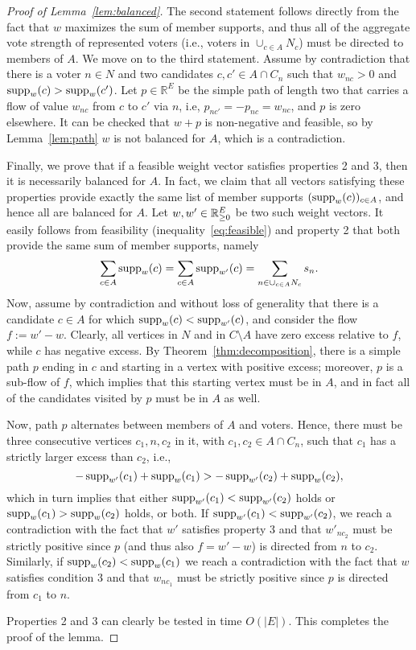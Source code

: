 \begin{proof}[Proof of Lemma~\ref{lem:balanced}]
The second statement follows directly from the fact that $w$ maximizes the sum of member supports, and thus all of the aggregate vote strength of represented voters (i.e., voters in $\cup_{c\in A} N_c$) must be directed to members of $A$. 
We move on to the third statement. 
Assume by contradiction that there is a voter $n\in N$ and two candidates $c, c'\in A\cap C_n$ such that $w_{nc}>0$ and $\operatorname{supp}_w(c)>\operatorname{supp}_w(c')$. 
Let $p\in\mathbb{R}^E$ be the simple path of length two that carries a flow of value $w_{nc}$ from $c$ to $c'$ via $n$, i.e, $p_{nc'}=-p_{nc}=w_{nc}$, and $p$ is zero elsewhere. 
It can be checked that $w+p$ is non-negative and feasible, so by Lemma~\ref{lem:path} $w$ is not balanced for $A$, which is a contradiction. 

Finally, we prove that if a feasible weight vector satisfies properties 2 and 3, then it is necessarily balanced for $A$. 
In fact, we claim that all vectors satisfying these properties provide exactly the same list of member supports $(\operatorname{supp}_w(c))_{c\in A}$, and hence all are balanced for $A$. 
Let $w, w'\in\mathbb{R}_{\geq 0}^E$ be two such weight vectors. It easily follows from feasibility (inequality~\ref{eq:feasible}) and property 2 that both provide the same sum of member supports, namely 
$$\sum_{c\in A} \operatorname{supp}_w(c) = \sum_{c\in A} \operatorname{supp}_{w'}(c) =\sum_{n\in \cup_{c\in A} N_c} s_n.$$
% 
Now, assume by contradiction and without loss of generality that there is a candidate $c\in A$ for which $\operatorname{supp}_{w}(c)<\operatorname{supp}_{w'}(c)$, and consider the flow $f:=w'-w$. 
Clearly, all vertices in $N$ and in $C\setminus A$ have zero excess relative to $f$, while $c$ has negative excess. 
By Theorem~\ref{thm:decomposition}, there is a simple path $p$ ending in $c$ and starting in a vertex with positive excess; 
moreover, $p$ is a sub-flow of $f$, which implies that this starting vertex must be in $A$, and in fact all of the candidates visited by $p$ must be in $A$ as well.  

Now, path $p$ alternates between members of $A$ and voters. Hence, there must be three consecutive vertices $c_1, n, c_2$ in it, with $c_1, c_2\in A\cap C_{n}$, such that $c_1$ has a strictly larger excess than $c_2$, i.e., 
$$- \operatorname{supp}_{w'}(c_1)+\operatorname{supp}_w(c_1) > - \operatorname{supp}_{w'}(c_2) + \operatorname{supp}_w(c_2),$$ 
which in turn implies that either $\operatorname{supp}_{w'}(c_1)<\operatorname{supp}_{w'}(c_2)$ holds or $\operatorname{supp}_{w}(c_1)>\operatorname{supp}_w(c_2)$ holds, or both. 
If $\operatorname{supp}_{w'}(c_1)<\operatorname{supp}_{w'}(c_2)$, we reach a contradiction with the fact that $w'$ satisfies property 3 and that $w'_{nc_2}$ must be strictly positive since $p$ (and thus also $f=w'-w$) is directed from $n$ to $c_2$. 
Similarly, if $\operatorname{supp}_w(c_2)<\operatorname{supp}_{w}(c_1)$ we reach a contradiction with the fact that $w$ satisfies condition 3 and that $w_{nc_1}$ must be strictly positive since $p$ is directed from $c_1$ to $n$. 

Properties 2 and 3 can clearly be tested in time $O(|E|)$. This completes the proof of the lemma.
\end{proof}


